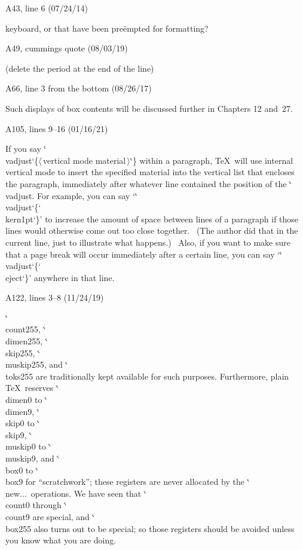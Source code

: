 \bugonpage A43, line 6 (07/24/14)

\tenpoint\noindent
keyboard, or that have been
pre\"empted for formatting?

\bugonpage A49, cummings quote (08/03/19)

(delete the period at the end of the line)

\bugonpage A66, line 3 from the bottom (08/26/17)

\ninepoint
Such displays of box contents will be discussed further in
Chapters 12 and~27.\cutpar

\bugonpage A105, lines 9--16 (01/16/21)

\ddanger If you say \.{\char`\\vadjust\char`\{}$\langle\,$vertical
mode material$\,\rangle$\.{\char`\}} within a
paragraph, \TeX\ will use internal vertical mode to insert the specified
material into the vertical
list that encloses the paragraph, immediately after whatever line
contained the position of the \.{\char`\\vadjust}. For example, you can say
`\.{\char`\\vadjust\char`\{\char`\\kern1pt\char`\}}'
to increase the amount of space between lines of a
paragraph if those lines would otherwise come out too close together.  \ (The
\vadjust{\kern1pt}author
did that in the current line, just to illustrate what happens.) \ Also,
if you want to make sure that a page break will occur immediately after a
certain line, you can say `\.{\char`\\vadjust\char`\{\char`\\eject\char`\}}'
anywhere in that line.

\bugonpage A122, lines 3--8 (11/24/19)

\ninepoint\noindent
\.{\char`\\count255}, \.{\char`\\dimen255}, \.{\char`\\skip255},
\.{\char`\\muskip255}, and \.{\char`\\toks255} are
traditionally kept available for such purposes.  Furthermore, plain \TeX\
reserves \.{\char`\\dimen0} to \.{\char`\\dimen9},
\.{\char`\\skip0} to \.{\char`\\skip9}, \.{\char`\\muskip0} to
\.{\char`\\muskip9}, and \.{\char`\\box0} to \.{\char`\\box9}
for ``scratchwork''; these registers
are never allocated by the \.{\char`\\new...}\null\ operations.  We have seen that
\.{\char`\\count0} through \.{\char`\\count9} are special,
and \.{\char`\\box255} also turns out to
be special; so those registers should be avoided unless you know what you
are doing.

